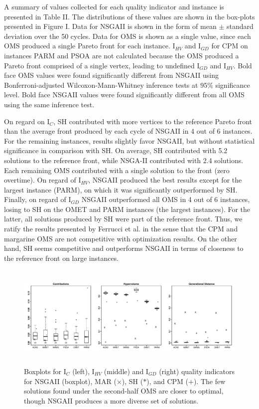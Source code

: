 \documentclass[conference]{IEEEtran}
\begin{document}
A summary of values collected for each quality indicator and instance is presented in Table II. The distributions of these values are shown in the box-plots presented in Figure I. Data for NSGAII is shown in the form of mean $\pm$ standard deviation over the 50 cycles. Data for OMS is shown as a single value, since each OMS produced a single Pareto front for each instance. I$_{HV}$ and I$_{GD}$ for CPM on instances PARM and PSOA are not calculated because the OMS produced a Pareto front comprised of a single vertex, leading to undefined I$_{GD}$ and I$_{HV}$. Bold face OMS values were found significantly different from NSGAII using Bonferroni-adjusted Wilcoxon-Mann-Whitney inference tests at 95\% significance level. Bold face NSGAII values were found significantly different from all OMS using the same inference test. 

On regard on I$_{C}$, SH contributed with more vertices to the reference Pareto front than the average front produced by each cycle of NSGAII in 4 out of 6 instances. For the remaining instances, results slightly favor NSGAII, but without statistical significance in comparison with SH. On average, SH contributed with 5.2 solutions to the reference front, while NSGA-II contributed with 2.4 solutions. Each remaining OMS contributed with a single solution to the front (zero overtime). On regard of I$_{HV}$, NSGAII produced the best results except for the largest instance (PARM), on which it was significantly outperformed by SH. Finally, on regard of I$_{GD}$ NSGAII outperformed all OMS in 4 out of 6 instances, losing to SH on the OMET and PARM instances (the largest instances). For the latter, all solutions produced by SH were part of the reference front. Thus, we ratify the results presented by Ferrucci et al. \cite{Ferrucci:2013} in the sense that the CPM and margarine OMS are not competitive with optimization results. On the other hand, SH seems competitive and outperforms NSGAII in terms of closeness to the reference front on large instances.

\begin{figure}
\centering
\includegraphics[width=18cm, height=5cm]{boxplots.pdf}
\caption{Boxplots for I$_{C}$ (left), I$_{HV}$ (middle) and I$_{GD}$ (right) quality indicators for NSGAII (boxplot), MAR ($\times$), SH ($\ast$), and CPM (+). The few solutions found under the second-half OMS are closer to optimal, though NSGAII produces a more diverse set of solutions.}
\end{figure}
\end{document}
